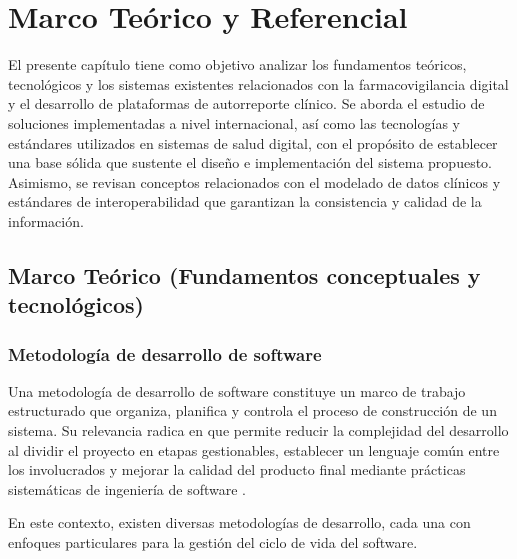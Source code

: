 \chapter{Marco Teórico y Referencial}\label{chapter:marco-teorico-referencial}

El presente capítulo tiene como objetivo analizar los fundamentos teóricos, tecnológicos y los sistemas existentes relacionados con la farmacovigilancia digital y el desarrollo de plataformas de autorreporte clínico. 
Se aborda el estudio de soluciones implementadas a nivel internacional, así como las tecnologías y estándares utilizados en sistemas de salud digital, con el propósito de establecer una base sólida que sustente el diseño e implementación del sistema propuesto.
Asimismo, se revisan conceptos relacionados con el modelado de datos clínicos y estándares de interoperabilidad que garantizan la consistencia y calidad de la información.


\section{Marco Teórico (Fundamentos conceptuales y tecnológicos)}

\subsection{Metodología de desarrollo de software}

Una metodología de desarrollo de software constituye un marco de trabajo estructurado que organiza, planifica y controla el proceso de construcción de un sistema. 
Su relevancia radica en que permite reducir la complejidad del desarrollo al dividir el proyecto en etapas gestionables, establecer un lenguaje común entre los involucrados y mejorar la calidad del producto final mediante prácticas sistemáticas de ingeniería de software \cite{Pfleeger2015}.

En este contexto, existen diversas metodologías de desarrollo, cada una con enfoques particulares para la gestión del ciclo de vida del software.

